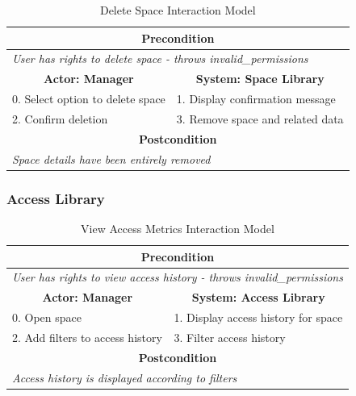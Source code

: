 \begin{table}[H]
\centering
\begin{tabular}{|l|l|}
\hline
\multicolumn{2}{|c|}{\textbf{Precondition}}                             \\ \hline
\multicolumn{2}{|l|}{\textit{User has rights to delete space - throws invalid\_permissions}}        \\ \hline
\multicolumn{1}{|c|}{\textbf{Actor: Manager}} & \multicolumn{1}{c|}{\textbf{System: Space Library}} \\ \hline
0. Select option to delete space   & 1. Display confirmation message    \\ \hline
2. Confirm deletion                & 3. Remove space and related data   \\ \hline
\multicolumn{2}{|c|}{\textbf{Postcondition}}                            \\ \hline
\multicolumn{2}{|l|}{\textit{Space details have been entirely removed}} \\ \hline
\end{tabular}
\caption{Delete Space Interaction Model}
\label{tab:delete_space_interaction}
\end{table}

\subsubsection{Access Library}

\begin{table}[H]
\centering
\begin{tabular}{|l|l|}
\hline
\multicolumn{2}{|c|}{\textbf{Precondition}}                            \\ \hline
\multicolumn{2}{|l|}{\textit{User has rights to view access history - throws invalid\_permissions}}  \\ \hline
\multicolumn{1}{|c|}{\textbf{Actor: Manager}} & \multicolumn{1}{c|}{\textbf{System: Access Library}} \\ \hline
0. Open space                    & 1. Display access history for space \\ \hline
2. Add filters to access history & 3. Filter access history            \\ \hline
\multicolumn{2}{|c|}{\textbf{Postcondition}}                           \\ \hline
\multicolumn{2}{|l|}{\textit{Access history is displayed according to filters}}                      \\ \hline
\end{tabular}
\caption{View Access Metrics Interaction Model}
\label{tab:access_metrics_interaction}
\end{table}

